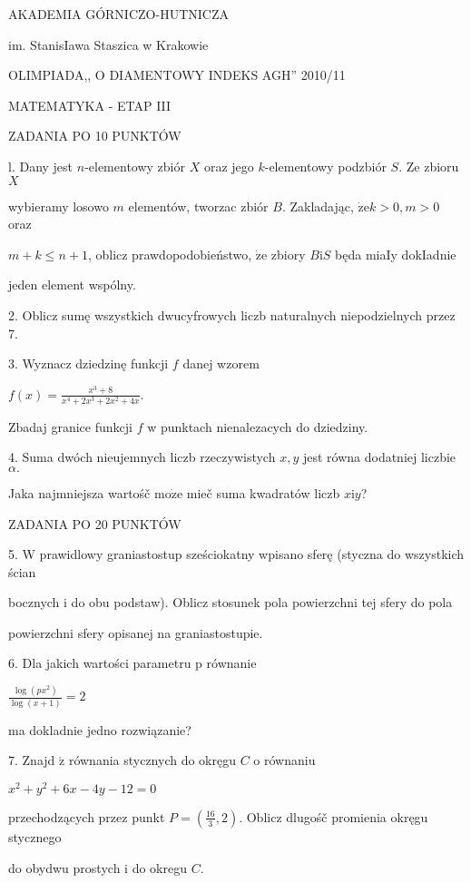 \documentclass[a4paper,12pt]{article}
\begin{document}
AKADEMIA GÓRNICZO-HUTNICZA

im. StanisIawa Staszica w Krakowie

OLIMPIADA,, O DIAMENTOWY INDEKS AGH'' 2010/11

MATEMATYKA - ETAP III

ZADANIA PO 10 PUNKTÓW

l. Dany jest $n$-elementowy zbiór $X$ oraz jego $k$-elementowy podzbiór $S$. Ze zbioru $X$

wybieramy losowo $m$ elementów, tworzac zbiór $B$. Zakladając, $\dot{\mathrm{z}}\mathrm{e}k>0, m>0$ oraz

$m+k\leq n+1$, oblicz prawdopodobieństwo, $\dot{\mathrm{z}}\mathrm{e}$ zbiory $B\mathrm{i}S$ będa miaIy dokIadnie

jeden element wspólny.

2. Oblicz sumę wszystkich dwucyfrowych liczb naturalnych niepodzielnych przez 7.

3. Wyznacz dziedzinę funkcji $f$ danej wzorem

$f(x)=\displaystyle \frac{x^{3}+8}{x^{4}+2x^{3}+2x^{2}+4x}.$

Zbadaj granice funkcji $f$ w punktach nienalezacych do dziedziny.

4. Suma dwóch nieujemnych liczb rzeczywistych $x, y$ jest równa dodatniej liczbie $\alpha.$

Jaka najmniejsza wartośč $\mathrm{m}\mathrm{o}\dot{\mathrm{z}}\mathrm{e}$ mieč suma kwadratów liczb $x\mathrm{i}y$?

ZADANIA PO 20 PUNKTÓW

5. W prawidlowy graniastostup sześciokatny wpisano sferę (styczna do wszystkich ścian

bocznych i do obu podstaw). Oblicz stosunek pola powierzchni tej sfery do pola

powierzchni sfery opisanej na graniastostupie.

6. Dla jakich wartości parametru p równanie

$\displaystyle \frac{\log(px^{2})}{\log(x+1)}=2$

ma dokladnie jedno rozwiązanie?

7. Znajd $\acute{\mathrm{z}}$ równania stycznych do okręgu $C$ o równaniu

$x^{2}+y^{2}+6x-4y-12=0$

przechodzących przez punkt $P=(\displaystyle \frac{16}{3},2)$. Oblicz dlugośč promienia okręgu stycznego

do obydwu prostych i do okregu $C.$
\end{document}
